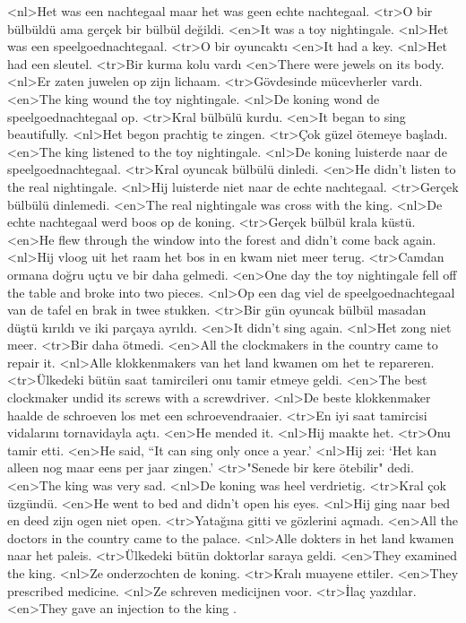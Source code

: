 <nl>Het was een nachtegaal maar het was geen echte nachtegaal.
<tr>O bir bülbüldü ama gerçek bir bülbül değildi.
<en>It was a toy nightingale.
<nl>Het was een speelgoednachtegaal.
<tr>O bir oyuncaktı
<en>It had a key.
<nl>Het had een sleutel.
<tr>Bir kurma kolu vardı
<en>There were jewels on its body.
<nl>Er zaten juwelen op zijn lichaam.
<tr>Gövdesinde mücevherler vardı.
<en>The king wound the toy nightingale.
<nl>De koning wond de speelgoednachtegaal op.
<tr>Kral bülbülü kurdu.
<en>It began to sing beautifully.
<nl>Het begon prachtig te zingen.
<tr>Çok güzel ötemeye başladı.
<en>The king listened to the toy nightingale.
<nl>De koning luisterde naar de speelgoednachtegaal. 
<tr>Kral oyuncak bülbülü dinledi.
<en>He didn’t listen to the real nightingale.
<nl>Hij luisterde niet naar de echte nachtegaal.
<tr>Gerçek bülbülü dinlemedi.
<en>The real nightingale was cross with the king.
<nl>De echte nachtegaal werd boos op de koning.
<tr>Gerçek bülbül krala küstü.
<en>He flew through the window into the forest and didn’t come back again.
<nl>Hij vloog uit het raam het bos in en kwam niet meer terug.
<tr>Camdan ormana doğru uçtu ve bir daha gelmedi.
<en>One day the toy nightingale fell off the table and broke into two pieces.
<nl>Op een dag viel de speelgoednachtegaal van de tafel en brak in twee stukken.
<tr>Bir gün oyuncak bülbül masadan düştü kırıldı ve iki parçaya ayrıldı.
<en>It didn’t sing again.
<nl>Het zong niet meer.
<tr>Bir daha ötmedi.
<en>All the clockmakers in the country came to repair it. 
<nl>Alle klokkenmakers van het land kwamen om het te repareren. 
<tr>Ülkedeki bütün saat tamircileri onu tamir etmeye geldi.
<en>The best clockmaker undid its screws with a screwdriver.
<nl>De beste klokkenmaker haalde de schroeven los met een schroevendraaier.
<tr>En iyi saat tamircisi vidalarını tornavidayla açtı.
<en>He mended it.
<nl>Hij maakte het. 
<tr>Onu tamir etti.
<en>He said, “It can sing only once a year.'
<nl>Hij zei: `Het kan alleen nog maar eens per jaar zingen.'
<tr>"Senede bir kere ötebilir" dedi.
<en>The king was very sad.
<nl>De koning was heel verdrietig.
<tr>Kral çok üzgündü.
<en>He went to bed and didn’t open his eyes.
<nl>Hij ging naar bed en deed zijn ogen niet open.
<tr>Yatağına gitti ve gözlerini açmadı.
<en>All the doctors in the country came to the palace.
<nl>Alle dokters in het land kwamen naar het paleis.
<tr>Ülkedeki bütün doktorlar saraya geldi.
<en>They examined the king.
<nl>Ze onderzochten de koning.
<tr>Kralı muayene ettiler.
<en>They prescribed medicine.
<nl>Ze schreven  medicijnen voor.
<tr>İlaç yazdılar.
<en>They gave an injection to the king .
